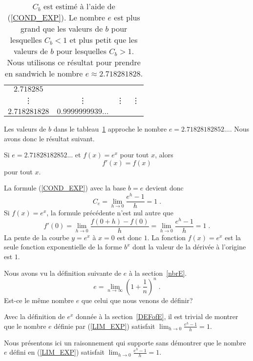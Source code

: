 {\begin{table}
{\begin{center}
\begin{tabular}{|c|c|c|l|}
$2.718285$ \\
 \vdots & \vdots & \vdots & \vdots \\
$2.718281828$ & $0.9999999939\ldots$ & & \\
\hline
\end{tabular}
\end{center}
}
\caption[Approximation de $e$]{$C_b$ est estimé à l'aide de (\ref{COND_EXP}).
Le nombre $e$ est plus grand que les valeurs de $b$ pour lesquelles
$C_b<1$ et plus petit que les valeurs de $b$ pour lesquelles $C_b>1$.  Nous
utilisons ce résultat pour prendre en sandwich le nombre
$e \approx 2.718281828$.  \label{TAB_EXP}} 
\end{table}

Les valeurs de $b$ dans le tableau~\ref{TAB_EXP} approche le nombre
$e = 2.71828182852\ldots$.  Nous avons donc le résultat suivant.

\begin{prop}
Si $e = 2.71828182852\ldots$ et $f(x) = e^x$ pour tout $x$, alors
\[
f'(x) = f(x)
\]
pour tout $x$.
\end{prop}

La formule (\ref{COND_EXP}) avec la base $b = e$ devient donc
\[
C_e = \lim_{h\rightarrow 0} \frac{e^h-1}{h} = 1 \;.
\]
Si $f(x) = e^x$, la formule précédente n'est nul autre que
\[
f'(0) = \lim_{h\rightarrow 0} \frac{f(0+h) - f(0)}{h} =
\lim_{h\rightarrow 0} \frac{e^h-1}{h} = 1 \;.
\]
La pente de la courbe $y=e^x$ à $x=0$ est donc $1$.  La fonction
$f(x)=e^x$ est la seule fonction exponentielle de la forme $b^x$ dont
la valeur de la dérivée à l'origine est $1$.

\begin{rmk}
Nous avons vu la définition suivante de $e$ à la section~\ref{nbrE}.
\begin{equation} \label{LIM_EXP}
e = \lim_{n\rightarrow \infty} \left(1+\frac{1}{n}\right)^n \; .
\end{equation}
Est-ce le même nombre $e$ que celui que nous venons de définir?

Avec la définition de $e^x$ donnée à la section~\ref{DEFofE}, il est
trivial de montrer que le nombre $e$ définie par (\ref{LIM_EXP})
satisfait $\displaystyle \lim_{h\rightarrow 0} \frac{e^h-1}{h} = 1$.

Nous présentons ici un raisonnement qui supporte sans démontrer que le
nombre $e$ défini en (\ref{LIM_EXP}) satisfait
$\displaystyle \lim_{h\rightarrow 0} \frac{e^h-1}{h} = 1$.


\end{rmk}}
